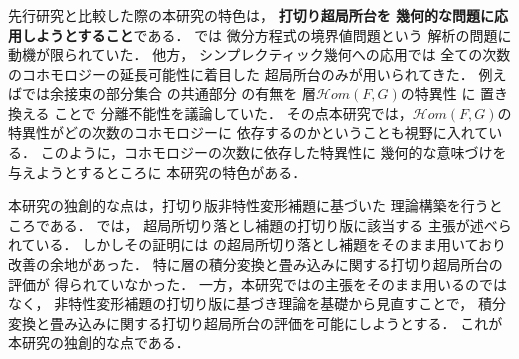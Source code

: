 \documentclass[11pt,a4paper,uplatex,dvipdfmx]{ujarticle} 		%
\newcommand{\研究課題名}{打切り超局所台を用いた層のフーリエ変換の研究とシンプレクティック幾何への応用}
\newcommand{\研究機関名}{北海道大学}
\newcommand{\研究代表者氏名}{大柴寿浩}
\newcommand{\ctext}[1]{\raise0.2ex\hbox{\textcircled{\scriptsize{#1}}}}
\begin{document}

\vspace{-24pt}
\subsubsection*{\underbar{\ctext{3} 研究の特色・独創的な点}}
\vspace{-10pt}
\paragraph{}
先行研究と比較した際の本研究の特色は，
\textbf{打切り超局所台を
幾何的な問題に応用しようとすること}である．
\cite{KMS03}では
微分方程式の境界値問題という
解析の問題に
動機が限られていた．
他方，
シンプレクティック幾何への応用では
全ての次数のコホモロジーの延長可能性に着目した
超局所台のみが用いられてきた．
例えば\cite{AI20}では余接束の部分集合
の共通部分
の有無を
層\(\mathcal{H}om(F,G)\)の特異性
に
置き換える
ことで
分離不能性を議論していた．
その点本研究では，\(\mathcal{H}om(F,G)\)の
特異性がどの次数のコホモロジーに
依存するのかということも視野に入れている．
このように，コホモロジーの次数に依存した特異性に
幾何的な意味づけを与えようとするところに
本研究の特色がある．


本研究の独創的な点は，打切り版非特性変形補題に基づいた
理論構築を行うところである．
\cite{MM07}では，
超局所切り落とし補題の打切り版に該当する
主張が述べられている．
しかしその証明には
\cite{KS90}の超局所切り落とし補題をそのまま用いており
改善の余地があった．
特に層の積分変換と畳み込みに関する打切り超局所台の評価が
得られていなかった．
一方，本研究では\cite{KS90}の主張をそのまま用いるのではなく，
非特性変形補題の打切り版に基づき理論を基礎から見直すことで，
積分変換と畳み込みに関する打切り超局所台の評価を可能にしようとする．
これが本研究の独創的な点である．
\vspace{-16pt}
\end{document}

